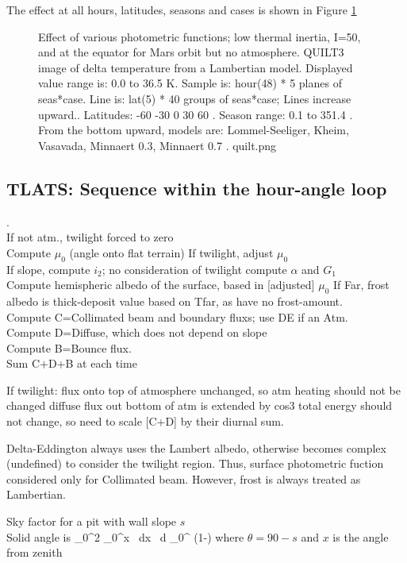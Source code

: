 The effect at all hours, latitudes, seasons and cases is shown in
Figure \ref{quilt}  
\begin{figure}[!ht] 
\caption[Effect of Photometric functions]{Effect of various photometric functions;
 low thermal inertia, I=50,  and at the equator for Mars orbit but no atmosphere. 
QUILT3 image of delta temperature from a Lambertian model.  Displayed value
range is: 0.0 to 36.5 K.  Sample is: hour(48) * 5 planes of seas*case.  Line is:
lat(5) * 40 groups of seas*case; Lines increase upward..  Latitudes: -60 -30 0
30 60 .  Season range: 0.1 to 351.4 . From the bottom upward, models are:
Lommel-Seeliger, Kheim, Vasavada, Minnaert 0.3, Minnaert 0.7 .
\label{quilt}  quilt.png }
\end{figure} 


\subsection{TLATS: Sequence within the hour-angle loop }
.
\\ If not atm., twilight forced to zero
\\ Compute $\mu_0$ (angle onto flat terrain)
\qi If twilight, adjust $\mu_0$
\\ If slope, compute $i_2$; no consideration of twilight
\qi compute $\alpha$ and $G_1$
\\ Compute hemispheric albedo of the surface, based in [adjusted]  $\mu_0$
\qi If Far, frost albedo is thick-deposit value based on Tfar, as have no frost-amount.
\\ Compute C=Collimated beam and boundary fluxs; use DE if an Atm.
\\ Compute D=Diffuse, which does not depend on slope
\\ Compute B=Bounce flux.
\\ Sum C+D+B at each time

If twilight:
\qi flux onto top of atmosphere unchanged, so atm heating should not be changed
\qi diffuse flux out bottom of atm is extended by cos3
\qi total energy should not change, so need to scale [C+D] by their diurnal sum.


Delta-Eddington always uses the Lambert albedo, otherwise becomes complex
(undefined) to consider the twilight region. Thus, surface photometric fuction
considered only for Collimated beam. However, frost is always treated as
Lambertian.


 Sky factor for a pit with wall slope $s$
\\ Solid angle is 
\qb \int_0^{2\pi} \int_0^\theta \sin x \  dx \ d \pi {}_0^ \pi (1-\cos \theta) \qe where $\theta = 90 -s$ and $x$ is the angle from zenith

